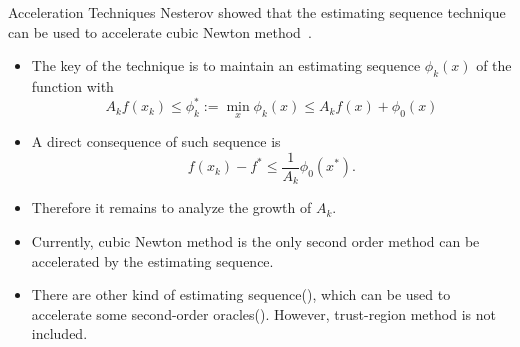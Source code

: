 \documentclass[10pt, notheorems, envcountsect]{beamer}
\theoremstyle{plain}
\begin{document}
\begin{frame}[allowframebreaks]{Acceleration Techniques}
    Nesterov showed that the estimating sequence technique can be used to accelerate cubic Newton method~\citet{nesterov_lectures_2018}.
    \begin{itemize}
        \item The key of the technique is to maintain an estimating sequence $\phi_k(x)$ of the function with 
        \begin{equation}
            \label{eq.estimating sequence}
            A_k f(x_k) \leq \phi_k^*:=\min_x \phi_k(x) \leq A_k f(x) + \phi_0(x)
        \end{equation}
        \item A direct consequence of such sequence is 
        \begin{equation}
            \label{eq.approximate xk}
            f(x_k)-f^* \leq \frac{1}{A_k} \phi_0(x^*).
        \end{equation}
        \item Therefore it remains to analyze the growth of $A_k$.
        \framebreak
        \item Currently, cubic Newton method is the only second order method can be accelerated by the estimating sequence.
        \item There are other kind of estimating sequence(\citet{monteiro2013accelerated}), which can be used to accelerate some second-order oracles(\citet{carmon2022optimal}). However, trust-region method is not included.
    \end{itemize}
\end{frame}
\end{document}
